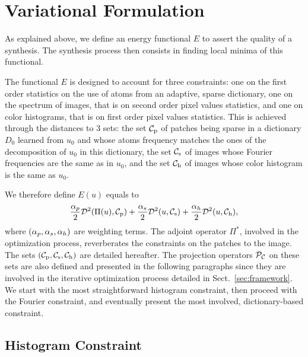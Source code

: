 \section{Variational Formulation}
\label{sec:variational}

As explained above, we define an energy functional $E$ to assert the quality of a synthesis.
The synthesis process then consists in finding local minima of this functional.

The functional $E$ is designed to account for three constraints: one on the first order statistics on the use of atoms from an adaptive, sparse dictionary, one on the spectrum of images, that is on second order pixel values statistics, and one on color histograms, that is on first order pixel values statistics.
This is achieved through the distances to 3 sets: the set ${\mathcal{C}_{\mathrm{p}}}$ of patches being sparse in a dictionary $D_0$ learned from $u_0$ and whose atoms frequency matches the ones of the decomposition of $u_0$ in this dictionary, the set ${\mathcal{C}_{\mathrm{s}}}$ of images whose Fourier frequencies are the same as in $u_0$, and the set ${\mathcal{C}_{\mathrm{h}}}$ of images whose color histogram is the same as $u_0$.

We therefore define $E(u)$ equals to
\begin{equation}
  \label{eq:cost-function}
  \frac{\alpha_p}{2}\mathcal{D}^2(\Pi(u),{\mathcal{C}_{\mathrm{p}}}) + \frac{\alpha_s}{2}\mathcal{D}^2(u,{\mathcal{C}_{\mathrm{s}}}) + \frac{\alpha_h}{2}\mathcal{D}^2(u,{\mathcal{C}_{\mathrm{h}}}),
\end{equation}
where $(\alpha_p,\alpha_s,\alpha_h)$ are weighting terms.
The adjoint operator $\Pi^*$, involved in the optimization process, reverberates the constraints on the patches to the image.
The sets $({\mathcal{C}_{\mathrm{p}}},{\mathcal{C}_{\mathrm{s}}},{\mathcal{C}_{\mathrm{h}}})$ are detailed hereafter.
The projection operators $\mathcal{P}_{\mathcal{C}_{\mathrm{}}}$ on these sets are also defined and presented in the following paragraphs since they are involved in the iterative optimization process detailed in Sect.~\ref{sec:framework}.
We start with the most straightforward histogram constraint, then proceed with the Fourier constraint, and eventually present the most involved, dictio\-nary-based constraint.


\subsection{Histogram Constraint}
\label{sub:histogram-constraint}

